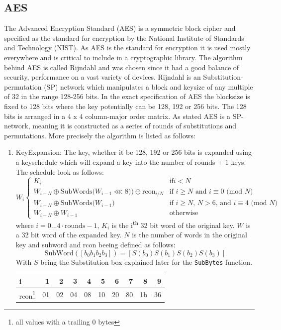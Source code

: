 \documentclass[a4paper]{article}
\begin{document}
\begin{enumerate}
\subsection{AES}
\label{AESalg}
The Advanced Encryption Standard (AES) is a symmetric block cipher and specified as the standard for encryption by the National Institute of Standards and Technology (NIST). As AES is the standard for encryption it is used mostly everywhere and is critical to include in a cryptographic library. The algorithm behind AES is called Rijndahl and was chosen since it had a good balance of security, performance on a vast variety of devices\cite{AESofficial}. Rijndahl is an Substitution-permutation (SP) network which manipulates a block and keysize of any multiple of 32 in the range 128-256 bits. In the exact specification of AES the blocksize is fixed to 128 bits where the key potentially can be 128, 192 or 256 bits. The 128 bits is arranged in a 4 x 4 column-major order matrix. As stated AES is a SP-network, meaning it is constructed as a series of rounds of substitutions and permutations. More precisely the algorithm is listed as follows:
\begin{enumerate}
\item KeyExpansion: The key, whether it be 128, 192 or 256 bits is expanded using a keyschedule which will expand a key into the number of rounds + 1 keys. The schedule look as follows:
\begin{equation}
W_i \begin{cases}
    K_i & \text{if} i < N\\
    W_{i-N} \oplus \text{SubWords($W_{i-1}\lll 8$))} \oplus \text{rcon}_{i/N} & \text{if $i \geq N$ and $i \equiv 0$ (mod $N$)}\\
    W_{i-N} \oplus \text{SubWords($W_{i-1}$)} & \text{if $i \geq N$, $N > 6$, and $i \equiv 4$ (mod $N$)}\\
    W_{i-N} \oplus W_{i-1} & \text{otherwise}
\end{cases}
\end{equation}
where \(i = 0 ... 4 \cdot \text{rounds} - 1\), \(K_i\) is the i\textsuperscript{th} 32 bit word of the original key. \(W\) is a 32 bit word of the expanded key. \(N\) is the number of words in the original key and subword and rcon beeing defined as follows:
\begin{equation}
 \text{SubWord}([b_0 b_1 b_2 b_3]) = [S(b_0) S(b_1) S(b_2) S(b_3)] \text{}
\end{equation}
With \(S\) being the Substitution box explained later for the \texttt{SubBytes} function.
\begin{center}
\begin{tabular}{lrrrrrrrrr}
i & 1 & 2 & 3 & 4 & 5 & 6 & 7 & 8 & 9\\
\hline
rcon\footnote{all values with a trailing 0 bytes} & 01 & 02 & 04 & 08 & 10 & 20 & 80 & 1b & 36\\
\end{tabular}


\end{center}
\end{enumerate}
\end{enumerate}
\end{document}

